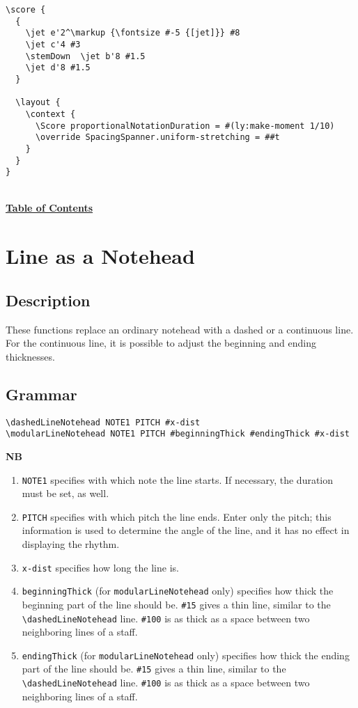 \documentclass[11pt, oneside]{book}   	%
\begin{document}
\begin{verbatim}
\score {
  {
    \jet e'2^\markup {\fontsize #-5 {[jet]}} #8
    \jet c'4 #3
    \stemDown  \jet b'8 #1.5
    \jet d'8 #1.5
  }

  \layout {
    \context {
      \Score proportionalNotationDuration = #(ly:make-moment 1/10)    
      \override SpacingSpanner.uniform-stretching = ##t
    }
  }
}
\end{verbatim}
\hyperref[sec:toc]{\\ \textbf{Table of Contents}}

\vfill \break




\section {Line as a Notehead}
\hfill

\subsection{Description}
These functions replace an ordinary notehead with a dashed or a continuous line. For the continuous line, it is possible to adjust the beginning and ending thicknesses.
\subsection{Grammar}
\begin{verbatim}
\dashedLineNotehead NOTE1 PITCH #x-dist
\modularLineNotehead NOTE1 PITCH #beginningThick #endingThick #x-dist
\end{verbatim}

\textbf{NB} 
\begin{enumerate} 
\item \verb|NOTE1| specifies with which note the line starts. If necessary, the duration must be set, as well.
\item \verb|PITCH| specifies with which pitch the line ends. Enter only the pitch; this information is used to determine the angle of the line, and it has no effect in displaying the rhythm.  
\item \verb|x-dist| specifies how long the line is.  
\item \verb|beginningThick| (for \verb|modularLineNotehead| only) specifies how thick the beginning part of the line should be. \verb|#15| gives a thin line, similar to the \verb|\dashedLineNotehead| line. \verb|#100| is as thick as a space between two neighboring lines of a staff.
\item \verb|endingThick| (for \verb|modularLineNotehead| only) specifies how thick the ending part of the line should be. \verb|#15| gives a thin line, similar to the \verb|\dashedLineNotehead| line. \verb|#100| is as thick as a space between two neighboring lines of a staff.
\end{enumerate}
\end{document}
